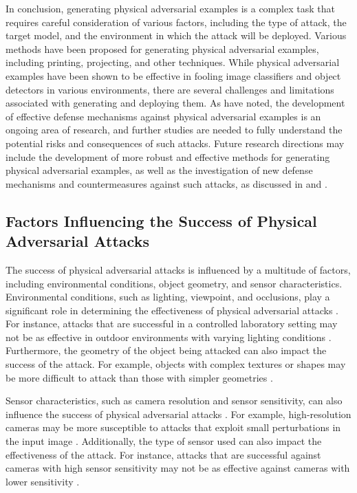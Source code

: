 \documentclass[11pt,a4paper]{article}
\begin{document}
In conclusion, generating physical adversarial examples is a complex task that requires careful consideration of various factors, including the type of attack, the target model, and the environment in which the attack will be deployed. Various methods have been proposed for generating physical adversarial examples, including printing, projecting, and other techniques. While physical adversarial examples have been shown to be effective in fooling image classifiers and object detectors in various environments, there are several challenges and limitations associated with generating and deploying them. As \cite{doi:10.1016/j.eng.2019.12.012} have noted, the development of effective defense mechanisms against physical adversarial examples is an ongoing area of research, and further studies are needed to fully understand the potential risks and consequences of such attacks. Future research directions may include the development of more robust and effective methods for generating physical adversarial examples, as well as the investigation of new defense mechanisms and countermeasures against such attacks, as discussed in \cite{doi:10.1049/cit2.12028} and \cite{doi:10.1109/access.2022.3208131}.


\subsection{Factors Influencing the Success of Physical Adversarial Attacks}


The success of physical adversarial attacks is influenced by a multitude of factors, including environmental conditions, object geometry, and sensor characteristics. Environmental conditions, such as lighting, viewpoint, and occlusions, play a significant role in determining the effectiveness of physical adversarial attacks \cite{doi:10.24963/ijcai.2021/694}. For instance, attacks that are successful in a controlled laboratory setting may not be as effective in outdoor environments with varying lighting conditions \cite{arxiv:1707.08945}. Furthermore, the geometry of the object being attacked can also impact the success of the attack. For example, objects with complex textures or shapes may be more difficult to attack than those with simpler geometries \cite{doi:10.1007/978-3-030-10925-7_4}.

Sensor characteristics, such as camera resolution and sensor sensitivity, can also influence the success of physical adversarial attacks \cite{arxiv:1906.11897}. For example, high-resolution cameras may be more susceptible to attacks that exploit small perturbations in the input image \cite{doi:10.1109/iccvw.2019.00257}. Additionally, the type of sensor used can also impact the effectiveness of the attack. For instance, attacks that are successful against cameras with high sensor sensitivity may not be as effective against cameras with lower sensitivity \cite{arxiv:1807.07769}.
\end{document}
